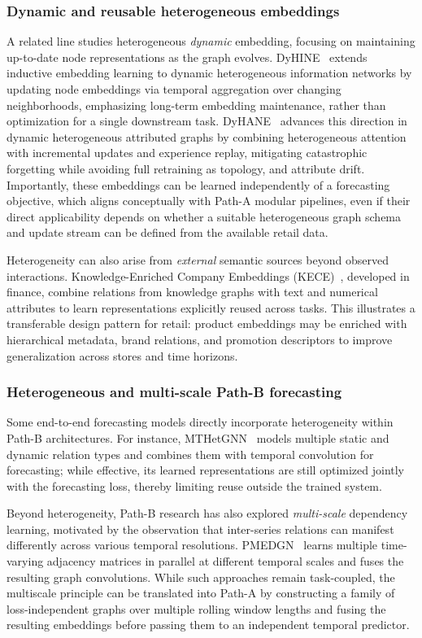 \subsubsection{Dynamic and reusable heterogeneous embeddings}
A related line studies heterogeneous \emph{dynamic} embedding, focusing on maintaining up-to-date node representations
as the graph evolves. DyHINE~\cite{xie2021dyhine} extends inductive embedding learning to dynamic heterogeneous
information networks by updating node embeddings via temporal aggregation over changing neighborhoods, emphasizing
long-term embedding maintenance, rather than optimization for a single downstream task. DyHANE~\cite{martirano2024dyhane}
advances this direction in dynamic heterogeneous attributed graphs by combining heterogeneous attention with
incremental updates and experience replay, mitigating catastrophic forgetting while avoiding full retraining as
topology, and attribute drift. Importantly, these embeddings can be learned independently of a forecasting objective, which aligns conceptually with Path-A modular pipelines, even if their direct applicability depends on whether a suitable heterogeneous graph schema and update stream can be defined from the available retail data.

Heterogeneity can also arise from \emph{external} semantic sources beyond observed interactions. Knowledge-Enriched Company Embeddings (KECE)~\cite{ang2021kece}, developed in finance, combine relations from knowledge graphs with text and numerical attributes to learn representations explicitly reused across tasks. This illustrates a transferable
design pattern for retail: product embeddings may be enriched with hierarchical metadata, brand relations, and
promotion descriptors to improve generalization across stores and time horizons.

\subsubsection{Heterogeneous and multi-scale Path-B forecasting}
Some end-to-end forecasting models directly incorporate heterogeneity within Path-B architectures. For instance,
MTHetGNN~\cite{wang2021mthetgnnheterogeneousgraphembedding} models multiple static and dynamic relation types and
combines them with temporal convolution for forecasting; while effective, its learned representations are still
optimized jointly with the forecasting loss, thereby limiting reuse outside the trained system.

Beyond heterogeneity, Path-B research has also explored \emph{multi-scale} dependency learning, motivated by the
observation that inter-series relations can manifest differently across various temporal resolutions. PMEDGN~\cite{Hou2025PMEDGN}
learns multiple time-varying adjacency matrices in parallel at different temporal scales and fuses the resulting graph
convolutions. While such approaches remain task-coupled, the multiscale principle can be translated into Path-A by constructing a family of loss-independent graphs over multiple rolling window lengths and fusing the resulting embeddings before passing them to an independent temporal predictor.

